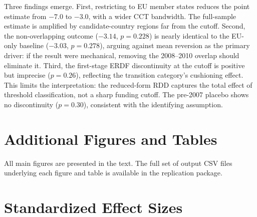 \documentclass[12pt]{article}
\begin{document}
Three findings emerge. First, restricting to EU member states reduces the point estimate from $-7.0$ to $-3.0$, with a wider CCT bandwidth. The full-sample estimate is amplified by candidate-country regions far from the cutoff. Second, the non-overlapping outcome ($-3.14$, $p = 0.228$) is nearly identical to the EU-only baseline ($-3.03$, $p = 0.278$), arguing against mean reversion as the primary driver: if the result were mechanical, removing the 2008--2010 overlap should eliminate it. Third, the first-stage ERDF discontinuity at the cutoff is positive but imprecise ($p = 0.26$), reflecting the transition category's cushioning effect. This limits the interpretation: the reduced-form RDD captures the total effect of threshold classification, not a sharp funding cutoff. The pre-2007 placebo shows no discontinuity ($p = 0.30$), consistent with the identifying assumption.

\section{Additional Figures and Tables}
\label{sec:appendix_exhibits}

All main figures are presented in the text. The full set of output CSV files underlying each figure and table is available in the replication package.

\section{Standardized Effect Sizes}
\label{sec:sde}
\end{document}
